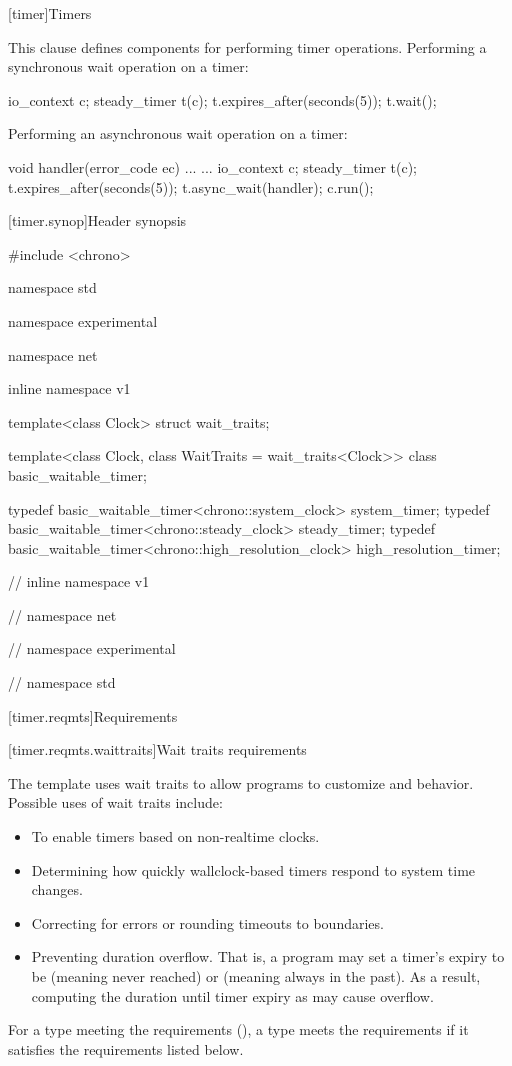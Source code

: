 
[timer]{Timers}

This clause defines components for performing timer operations.\pnum
\enterexample Performing a synchronous wait operation on a timer: 
\begin{codeblock}
io_context c;
steady_timer t(c);
t.expires_after(seconds(5));
t.wait();
\end{codeblock}
 \exitexample

\pnum
\enterexample Performing an asynchronous wait operation on a timer: 
\begin{codeblock}
void handler(error_code ec) { ... }
...
io_context c;
steady_timer t(c);
t.expires_after(seconds(5));
t.async_wait(handler);
c.run();
\end{codeblock}
 \exitexample


%
[timer.synop]{Header  synopsis}

\begin{codeblock}
#include <chrono>

namespace std {
namespace experimental {
namespace net {
inline namespace v1 {

  template<class Clock> struct wait_traits;

  template<class Clock, class WaitTraits = wait_traits<Clock>>
    class basic_waitable_timer;

  typedef basic_waitable_timer<chrono::system_clock> system_timer;
  typedef basic_waitable_timer<chrono::steady_clock> steady_timer;
  typedef basic_waitable_timer<chrono::high_resolution_clock> high_resolution_timer;

} // inline namespace v1
} // namespace net
} // namespace experimental
} // namespace std
\end{codeblock}



[timer.reqmts]{Requirements}


[timer.reqmts.waittraits]{Wait traits requirements}

The  template uses wait traits to allow programs to customize  and  behavior. \enternote Possible uses of wait traits include:
\begin{itemize}
\item
 To enable timers based on non-realtime clocks.
\item
 Determining how quickly wallclock-based timers respond to system time changes.
\item
 Correcting for errors or rounding timeouts to boundaries.
\item
 Preventing duration overflow. That is, a program may set a timer's expiry to be (meaning never reached) or (meaning always in the past). As a result, computing the duration until timer expiry as  may cause overflow. \exitnote
\end{itemize}\pnum
For a type  meeting the  requirements (), a type  meets the  requirements if it satisfies the requirements listed below.

